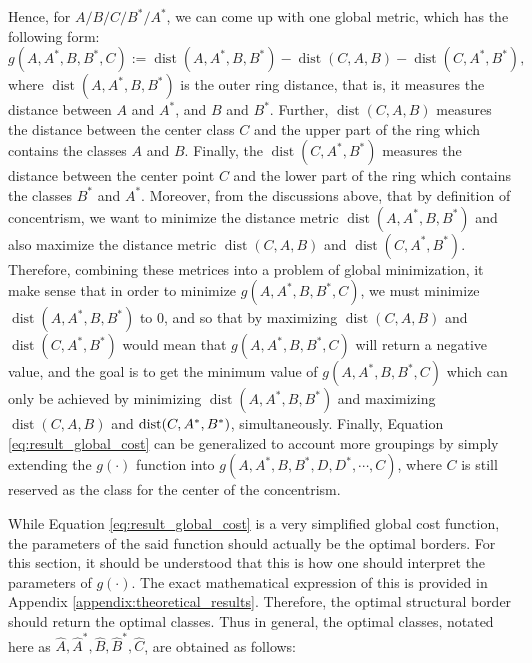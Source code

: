 Hence, for $A/B/C/B^*/A^*$, we can come up with one global metric, which has the following form:
\begin{equation}\label{eq:result_global_cost}
    g(A,A^*,B,B^*,C):=\operatorname{dist}(A,A^*,B,B^*)-\operatorname{dist}(C,A,B) - \operatorname{dist}(C,A^*,B^*),
\end{equation}
where $\operatorname{dist}(A,A^*,B,B^*)$ is the outer ring distance, that is, it measures the distance between $A$ and $A^*$, and $B$ and $B^*$. Further, $\operatorname{dist}(C,A,B)$ measures the distance between the center class $C$ and the upper part of the ring which contains the classes $A$ and $B$. Finally, the $\operatorname{dist}(C,A^*,B^*)$ measures the distance between the center point $C$ and the lower part of the ring which contains the classes $B^*$ and $A^*$. Moreover, from the discussions above, that by definition of concentrism, we want to minimize the distance metric $\operatorname{dist}(A,A^*,B,B^*)$ and also maximize the distance metric $\operatorname{dist}(C,A,B)$ and $\operatorname{dist}(C,A^*,B^*)$. Therefore, combining these metrices into a problem of global minimization, it make sense that in order to minimize $g(A,A^*,B,B^*,C)$, we must minimize $\operatorname{dist}(A,A^*,B,B^*)$ to 0, and so that by maximizing $\operatorname{dist}(C,A,B)$ and $\operatorname{dist}(C,A^*,B^*)$ would mean that $g(A,A^*,B,B^*,C)$ will return a negative value, and the goal is to get the minimum value of $g(A,A^*,B,B^*,C)$ which can only be achieved by minimizing $\operatorname{dist}(A,A^*,B,B^*)$ and maximizing $\operatorname{dist}(C,A,B)$ and $\operatorname{dist}(C,\newline A^*,B^*)$, simultaneously. Finally, Equation \ref{eq:result_global_cost} can be generalized to account more groupings by simply extending the $g(\cdot)$ function into $g(A,A^*,B,B^*,D,D^*,\cdots, C)$, where $C$ is still reserved as the class for the center of the concentrism.

While Equation \ref{eq:result_global_cost} is a very simplified global cost function, the parameters of the said function should actually be the optimal borders. For this section, it should be understood that this is how one should interpret the parameters of $g(\cdot)$. The exact mathematical expression of this is provided in Appendix \ref{appendix:theoretical_results}. Therefore, the optimal structural border should return the optimal classes. Thus in general, the optimal classes, notated here as $\hat{A},\hat{A}^*,\hat{B},\hat{B}^*,\hat{C}$, are obtained as follows:

